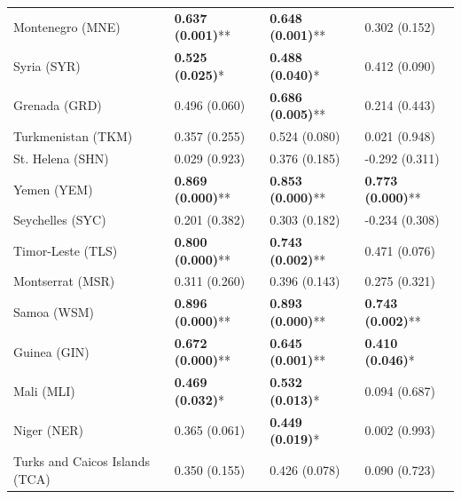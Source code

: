 \begin{longtable}{p{5cm}p{3cm}p{3cm}p{5cm}}
Montenegro (MNE) & \textcolor{atlLime600}{\textbf{0.637 (0.001)}**} & \textcolor{atlLime600}{\textbf{0.648 (0.001)}**} & \textcolor{atlOrange600}{0.302 (0.152)} \\
Syria (SYR) & \textcolor{atlLime600}{\textbf{0.525 (0.025)}*} & \textcolor{atlLime600}{\textbf{0.488 (0.040)}*} & \textcolor{atlOrange600}{0.412 (0.090)} \\
Grenada (GRD) & \textcolor{atlOrange600}{0.496 (0.060)} & \textcolor{atlLime600}{\textbf{0.686 (0.005)}**} & \textcolor{atlOrange600}{0.214 (0.443)} \\
Turkmenistan (TKM) & \textcolor{atlOrange600}{0.357 (0.255)} & \textcolor{atlOrange600}{0.524 (0.080)} & \textcolor{atlOrange600}{0.021 (0.948)} \\
St. Helena (SHN) & \textcolor{atlOrange600}{0.029 (0.923)} & \textcolor{atlOrange600}{0.376 (0.185)} & \textcolor{atlOrange600}{-0.292 (0.311)} \\
Yemen (YEM) & \textcolor{atlLime600}{\textbf{0.869 (0.000)}**} & \textcolor{atlLime600}{\textbf{0.853 (0.000)}**} & \textcolor{atlLime600}{\textbf{0.773 (0.000)}**} \\
Seychelles (SYC) & \textcolor{atlOrange600}{0.201 (0.382)} & \textcolor{atlOrange600}{0.303 (0.182)} & \textcolor{atlOrange600}{-0.234 (0.308)} \\
Timor-Leste (TLS) & \textcolor{atlLime600}{\textbf{0.800 (0.000)}**} & \textcolor{atlLime600}{\textbf{0.743 (0.002)}**} & \textcolor{atlOrange600}{0.471 (0.076)} \\
Montserrat (MSR) & \textcolor{atlOrange600}{0.311 (0.260)} & \textcolor{atlOrange600}{0.396 (0.143)} & \textcolor{atlOrange600}{0.275 (0.321)} \\
Samoa (WSM) & \textcolor{atlLime600}{\textbf{0.896 (0.000)}**} & \textcolor{atlLime600}{\textbf{0.893 (0.000)}**} & \textcolor{atlLime600}{\textbf{0.743 (0.002)}**} \\
Guinea (GIN) & \textcolor{atlLime600}{\textbf{0.672 (0.000)}**} & \textcolor{atlLime600}{\textbf{0.645 (0.001)}**} & \textcolor{atlLime600}{\textbf{0.410 (0.046)}*} \\
Mali (MLI) & \textcolor{atlLime600}{\textbf{0.469 (0.032)}*} & \textcolor{atlLime600}{\textbf{0.532 (0.013)}*} & \textcolor{atlOrange600}{0.094 (0.687)} \\
Niger (NER) & \textcolor{atlOrange600}{0.365 (0.061)} & \textcolor{atlLime600}{\textbf{0.449 (0.019)}*} & \textcolor{atlOrange600}{0.002 (0.993)} \\
Turks and Caicos Islands (TCA) & \textcolor{atlOrange600}{0.350 (0.155)} & \textcolor{atlOrange600}{0.426 (0.078)} & \textcolor{atlOrange600}{0.090 (0.723)} \\

\end{longtable}
